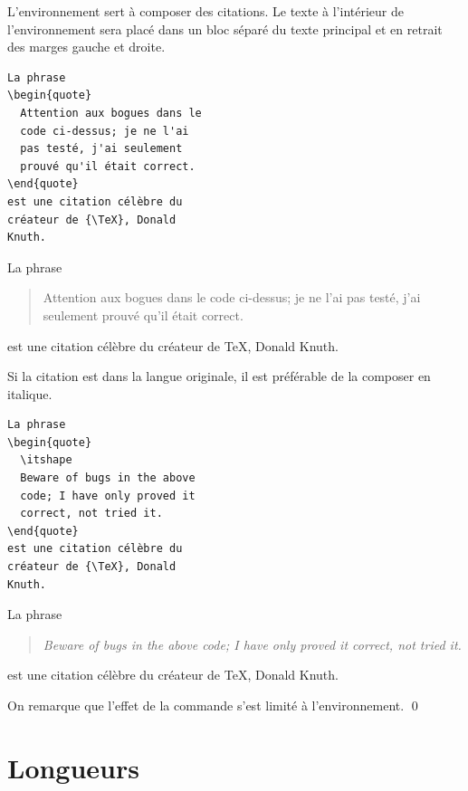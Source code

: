 \begin{exemple}
  L'environnement  sert à composer des citations. Le texte à
  l'intérieur de l'environnement sera placé dans un bloc séparé du
  texte principal et en retrait des marges gauche et droite.
  \begin{demo}
    \begin{texample}
\begin{lstlisting}
La phrase
\begin{quote}
  Attention aux bogues dans le
  code ci-dessus; je ne l'ai
  pas testé, j'ai seulement
  prouvé qu'il était correct.
\end{quote}
est une citation célèbre du
créateur de {\TeX}, Donald
Knuth.
\end{lstlisting}
      \producing
      La phrase
      \begin{quote}
        Attention aux bogues dans le code ci-dessus; je ne l'ai pas testé,
        j'ai seulement prouvé qu'il était correct.
      \end{quote}
      est une citation célèbre du créateur de {\TeX}, Donald Knuth.
    \end{texample}
  \end{demo}
  Si la citation est dans la langue originale, il est préférable de la
  composer en italique.
  \begin{demo}
    \begin{texample}
\begin{lstlisting}
La phrase
\begin{quote}
  \itshape
  Beware of bugs in the above
  code; I have only proved it
  correct, not tried it.
\end{quote}
est une citation célèbre du
créateur de {\TeX}, Donald
Knuth.
\end{lstlisting}
      \producing
      La phrase
      \begin{quote}
        \itshape
        Beware of bugs in the above code; I have only proved it
        correct, not tried it.
      \end{quote}
      est une citation célèbre du créateur de {\TeX}, Donald Knuth.
    \end{texample}
  \end{demo}
  On remarque que l'effet de la commande \cmdprint{\itshape} s'est
  limité à l'environnement. %
  \qed
\end{exemple}


\section{Longueurs}
\label{sec:bases:longueurs}

